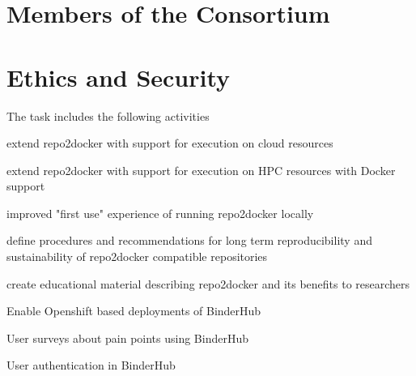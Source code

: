 \documentclass[
  deliverables,
  longtasklabels,
  noworkareas,
  svgnames,
  \classoptions
]{euproposal}       %
\begin{document}
\begin{proposal}

\newpage


\section{Members of the Consortium}



\newpage

\section{Ethics and Security}

\end{proposal}

\begin{draft}


  The task includes the following activities
  \begin{compactitem}
  \item extend repo2docker with support for execution on cloud resources
  \item extend repo2docker with support for execution on HPC resources with Docker support
  \item improved "first use" experience of running repo2docker locally
  \item define procedures and recommendations for long term reproducibility and sustainability of repo2docker compatible repositories
  \item create educational material describing repo2docker and its benefits to researchers
  \item Enable Openshift based deployments of BinderHub
  \item User surveys about pain points using BinderHub
  \item User authentication in BinderHub
  \end{compactitem}
  \end{draft}
\end{document}
